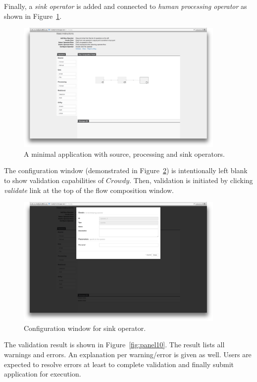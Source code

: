 Finally, a \textit{sink operator} is added and connected to 
\textit{human processing operator} as shown in Figure~\ref{fig:panel8}.

\begin{figure}[ht]
	\centering
	\includegraphics[width=0.9\textwidth]{figures/tool/panel8.png}
	\caption{A minimal application with source, processing and sink operators.}
	\label{fig:panel8}
\end{figure}

The configuration window (demonstrated in Figure~\ref{fig:panel9}) is intentionally 
left blank to show validation capabilities of $Crowdy$. Then, validation is 
initiated by clicking \textit{validate} link at the top of the flow composition window.

\begin{figure}[ht]
	\centering
	\includegraphics[width=0.9\textwidth]{figures/tool/panel9.png}
	\caption{Configuration window for sink operator.}
	\label{fig:panel9}
\end{figure}

The validation result is shown in Figure~\ref{fig:panel10}. The result lists all warnings 
and errors. An explanation per warning/error is given as well. Users are expected 
to resolve errors at least to complete validation and finally submit application for 
execution.

